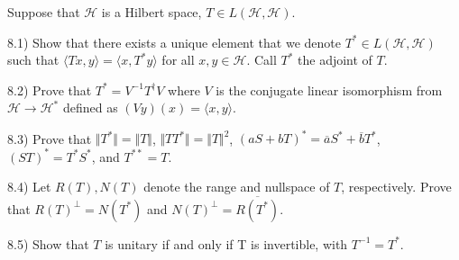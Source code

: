 \documentclass[10pt]{article}
\newenvironment{problem}[2][]{\begin{trivlist}
\item[\hskip \labelsep {\bfseries #1}\hskip \labelsep {\bfseries #2.}]}{\end{trivlist}}
\begin{document}
\begin{problem}{Question 8}

Suppose that $\mathcal{H}$ is a Hilbert space, $T \in L(\mathcal{H}, \mathcal{H})$.

8.1) Show that there exists a unique element that we denote $T^* \in L(\mathcal{H}, \mathcal{H})$ such that $\langle Tx, y \rangle = \langle x, T^* y \rangle $ for all $x, y \in \mathcal{H}$. Call $T^*$ the adjoint of $T$.

8.2) Prove that $T^* = V^{-1} T^\dag V$ where $V$ is the conjugate linear isomorphism from $\mathcal{H} \to \mathcal{H}^*$ defined as $(Vy)(x) = \langle x, y \rangle$.

8.3) Prove that $\Vert T^* \Vert = \Vert T \Vert$, $\Vert TT^* \Vert = \Vert T \Vert^2$, $(aS + bT)^* = \overline{a} S^* + \overline{b} T^*$, $(ST)^* = T^* S^*$, and $T^{**} = T$.

8.4) Let $R(T), N(T)$ denote the range and nullspace of $T$, respectively. Prove that $R(T)^\perp = N(T^*)$ and $N(T)^\perp = \overline{R(T^*)}$.

8.5) Show that $T$ is unitary if and only if T is invertible, with $T^{-1} = T^*$.

\end{problem}
\end{document}
